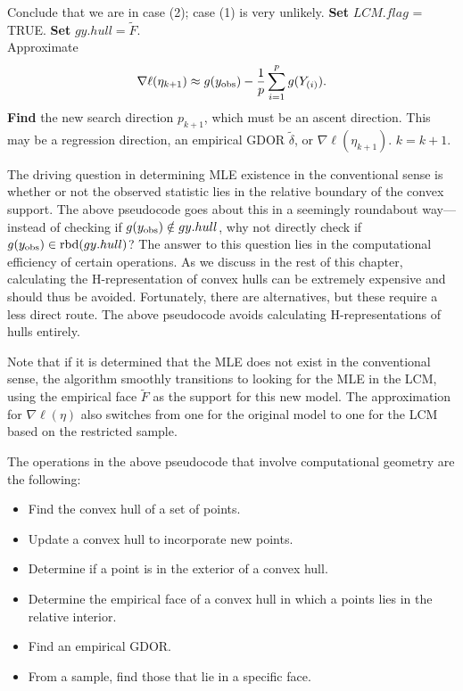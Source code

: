 {{\begin{algorithmic}
			\State Conclude that we are in case (2); case (1) is very unlikely.
			\State \textbf{Set} $LCM.flag$ = TRUE.
			\State \textbf{Set} $gy.hull = \tilde{F}$.
		\EndIf
	\EndIf
\EndIf\\
	\State Approximate 
	\begin{align} \label{E:nabla ell approx LCM}
	\nabla \ell( \eta_{k+1}) \approx g(y_{\text{obs}}) - \frac{1}{p}\sum_{i=1}^p g(Y_{(i)}).
	\end{align}
\State \textbf{Find} the new search direction $p_{k+1}$, which must be an ascent 
direction.
\State This may be a regression direction, an empirical GDOR $\tilde{\delta}$, or $\nabla \ell( \eta_{k+1})$.
\State $k = k + 1$.
\EndWhile
\end{algorithmic}
}
}

The driving question in determining MLE existence in the conventional sense is
whether or not the observed statistic lies in the relative boundary 
of the convex support.
The above pseudocode goes about this in a seemingly roundabout way---instead
of checking if $g(y_{\text{obs}}) \notin gy.hull$, why not directly check 
if $g(y_{\text{obs}}) \in \operatorname{rbd} (gy.hull)$?  The answer to this question lies
in the computational efficiency of certain operations.  As we discuss
in the rest of this chapter, calculating the H-representation of convex hulls
can be extremely expensive and should thus be avoided.
Fortunately, there are alternatives, but these require a less direct route.  The 
above pseudocode avoids calculating H-representations of hulls entirely.  

Note that if it is determined that the MLE does not exist in the conventional sense,
the algorithm smoothly transitions to looking for the MLE in the LCM, using the 
empirical face $\tilde{F}$ as the support for this new model.  
The approximation for $\nabla \ell (\eta)$
also switches from one for the original model to one for the LCM based on the restricted
sample.  

The operations in the above pseudocode that involve computational geometry are the following:
\begin{itemize}
\item Find the convex hull of a set of points.
\item Update a convex hull to incorporate new points.
\item Determine if a point is in the exterior of a convex hull.
\item Determine the empirical face of a convex hull in which a points lies in the relative interior.
\item Find an empirical GDOR.
\item From a sample, find those that lie in a specific face.
\end{itemize}

